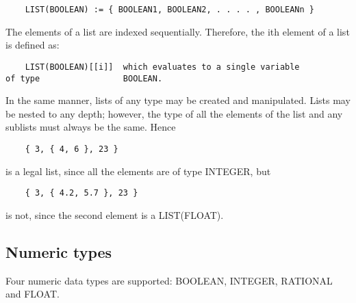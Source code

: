 \begin{verbatim}
	LIST(BOOLEAN) := { BOOLEAN1, BOOLEAN2, . . . . , BOOLEANn }
\end{verbatim}

The elements of a list are indexed sequentially.  Therefore, the ith
element of a list is defined as:

\begin{verbatim}
	LIST(BOOLEAN)[[i]]	which evaluates to a single variable
of type 				BOOLEAN.
\end{verbatim}

\noindent
In the same manner, lists of any type may be created and manipulated.
Lists may be nested to any depth; however, the type of all the elements
of the list and any sublists must always be the same.  Hence

\begin{verbatim}
	{ 3, { 4, 6 }, 23 }
\end{verbatim}

is a legal list, since all the elements are of type INTEGER, but

\begin{verbatim}
	{ 3, { 4.2, 5.7 }, 23 }
\end{verbatim}

is not, since the second element is a LIST(FLOAT).

\subsection{Numeric types}

Four numeric data types are supported: BOOLEAN, INTEGER,
RATIONAL and FLOAT.  

